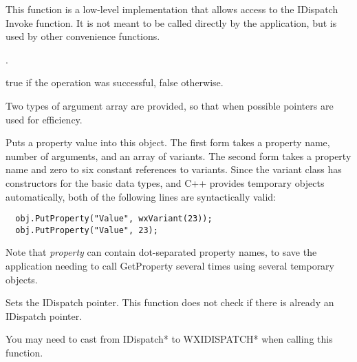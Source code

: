 
This function is a low-level implementation that allows access to the IDispatch Invoke function.
It is not meant to be called directly by the application, but is used by other convenience functions.




.





true if the operation was successful, false otherwise.


Two types of argument array are provided, so that when possible pointers are used for efficiency.

\label{wxautomationobjectputproperty}



Puts a property value into this object. The first form takes a property name, number of
arguments, and an array of variants. The second form takes a property name and zero to six
constant references to variants. Since the variant class has constructors for the basic
data types, and C++ provides temporary objects automatically, both of the following lines
are syntactically valid:

{\small
\begin{verbatim}
  obj.PutProperty("Value", wxVariant(23));
  obj.PutProperty("Value", 23);
\end{verbatim}
}

Note that {\it property} can contain dot-separated property names, to save the application
needing to call GetProperty several times using several temporary objects.

\label{wxautomationobjectsetdispatchptr}


Sets the IDispatch pointer. This function does not check if there is already an IDispatch pointer.

You may need to cast from IDispatch* to WXIDISPATCH* when calling this function.

